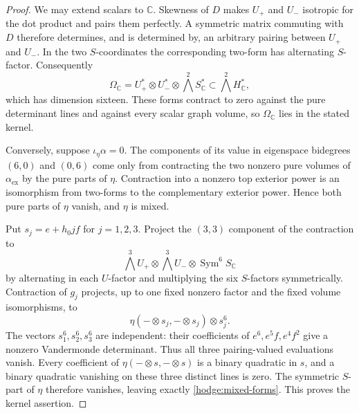 \documentclass[11pt]{article}
\theoremstyle{definition}
\theoremstyle{remark}
\numberwithin{equation}{section}
\begin{document}
\begin{proof}
We may extend scalars to $\mathbb C$.  Skewness of $D$ makes $U_+$ and $U_-$
isotropic for the dot product and pairs them perfectly.  A symmetric
matrix commuting with $D$ therefore determines, and is determined by,
an arbitrary pairing between $U_+$ and $U_-$.  In the two $S$-coordinates
the corresponding two-form has alternating $S$-factor.  Consequently
\begin{equation}
 \Omega_\mathbb C=
 U_+^*\otimes U_-^*\otimes\bigwedge^2S_\mathbb C^*
       \subset\bigwedge^2H_\mathbb C^*,
 \label{hodge:mixed-forms}
\end{equation}
which has dimension sixteen.  These forms contract to zero against the
pure determinant lines and against every scalar graph volume, so
$\Omega_\mathbb C$ lies in the stated kernel.

Conversely, suppose $\iota_\eta\alpha=0$.  The components of its value
in eigenspace bidegrees $(6,0)$ and $(0,6)$ come only from contracting
the two nonzero pure volumes of $\alpha_{\mathrm{ex}}$ by the pure parts
of $\eta$.  Contraction into a nonzero top exterior power is an
isomorphism from two-forms to the complementary exterior power.  Hence
both pure parts of $\eta$ vanish, and $\eta$ is mixed.

Put $s_j=e+h_0jf$ for $j=1,2,3$.
Project the $(3,3)$ component of the contraction to
\[
 \bigwedge^3U_+\otimes\bigwedge^3U_-\otimes
              \operatorname{Sym}^6S_\mathbb C
\]
by alternating in each $U$-factor and multiplying the six $S$-factors
symmetrically.  Contraction of $g_j$ projects, up to one fixed nonzero
factor and the fixed volume isomorphisms, to
\[
 \eta(-\otimes s_j,-\otimes s_j)\otimes s_j^6.
\]
The vectors $s_1^6,s_2^6,s_3^6$ are independent: their coefficients of
$e^6,e^5f,e^4f^2$ give a nonzero Vandermonde determinant.
Thus all three pairing-valued evaluations vanish.  Every coefficient
of $\eta(-\otimes s,-\otimes s)$ is a binary quadratic in $s$,
and a binary quadratic vanishing on these three distinct lines is zero.
The symmetric $S$-part of $\eta$ therefore vanishes, leaving exactly
\eqref{hodge:mixed-forms}.  This proves the kernel assertion.


\end{proof}
\end{document}
